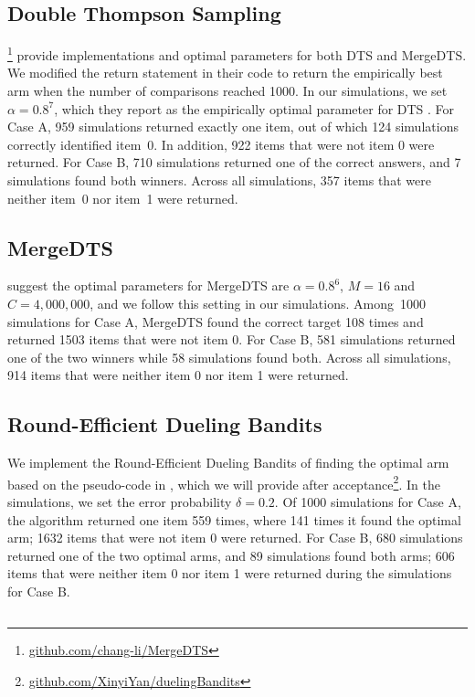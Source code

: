 \subsection{Double Thompson Sampling}
\citet{mergedts}\footnote{\url{github.com/chang-li/MergeDTS}} provide implementations and optimal parameters for both DTS and MergeDTS. We modified the return statement in their code to return the empirically best arm when the number of comparisons reached 1000. In our simulations, we set $\alpha = 0.8^7$, which they report as the empirically optimal parameter for DTS \cite{mergedts}. For Case A, 959 simulations returned exactly one item, out of which 124 simulations correctly identified item~0. In addition, 922 items that were not item 0 were returned. For Case B, 710 simulations returned one of the correct answers, and 7 simulations found both winners. Across all simulations, 357 items that were neither item~0 nor item~1 were returned.

\subsection{MergeDTS}
\citet{mergedts} suggest the optimal parameters for MergeDTS are $\alpha = 0.8^6$, $M = 16$ and $C=4,000,000$, and we follow this setting in our simulations. Among~1000 simulations for Case A, MergeDTS found the correct target 108 times and returned 1503 items that were not item 0. For Case B, 581 simulations returned one of the two winners while 58 simulations found both. Across all simulations, 914 items that were neither item 0 nor item 1 were returned.

\subsection{Round-Efficient Dueling Bandits} We implement the Round-Efficient Dueling Bandits of finding the optimal arm based on the pseudo-code in \citet{ll18}, which we will provide after acceptance\footnote{\url{github.com/XinyiYan/duelingBandits}}. In the simulations, we set the error probability $\delta=0.2$. Of 1000 simulations for Case A, the algorithm returned one item 559 times, where 141 times it found the optimal arm; 1632 items that were not item 0 were returned. For Case B, 680 simulations returned one of the two optimal arms, and 89 simulations found both arms; 606 items that were neither item 0 nor item 1 were returned during the simulations for Case B.

\subsection{\citet{cvs21}}

